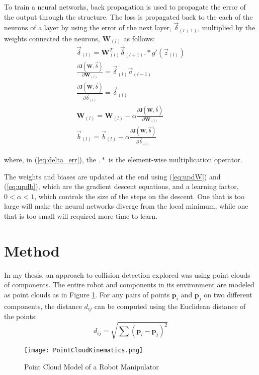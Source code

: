 \documentclass[conference]{IEEEtran}
\begin{document}
To train a neural networks, back propagation is used to propagate the error of the output through the structure. The loss is propagated back to the each of the neurons of a layer by using the error of the next layer, $\vec{\delta}_{(l+1)}$, multiplied by the weights connected the neurons, $\textbf{W}_{(l)}$ as follows:
\begin{gather}
\vec{\delta}_{(l)} = \textbf{W}_{(l)}^T \vec{\delta}_{(l+1)}.*g'(\vec{z}_{(l)}) \label{eq:delta_err}\\
\frac{\partial \textbf{J}(\textbf{W}, \vec{b})}{\partial \textbf{W}_{(l)}} = \vec{\delta}_{(l)}\vec{a}_{(l-1)}\\
\frac{\partial \textbf{J}(\textbf{W}, \vec{b})}{\partial \vec{b}_{(l)}} = \vec{\delta}_{(l)}\\
\textbf{W}_{(l)} = \textbf{W}_{(l)} - \alpha \frac{\partial \textbf{J}(\textbf{W}, \vec{b})}{\partial \textbf{W}_{(l)}} \label{eq:updW}\\
\vec{b}_{(l)} = \vec{b}_{(l)} - \alpha \frac{\partial \textbf{J}(\textbf{W}, \vec{b})}{\partial \vec{b}_{(l)}}\label{eq:updb}
\end{gather}

where, in (\ref{eq:delta_err}), the $.*$ is the element-wise multiplication operator. 
    
The weights and biases are updated at the end using (\ref{eq:updW}) and (\ref{eq:updb}), which are the gradient descent equations, and a learning factor, $0 < \alpha < 1$, which controls the size of the steps on the descent. One that is too large will make the neural networks diverge from the local minimum, while one that is too small will required more time to learn.

\section{Method}

In my thesis, an approach to collision detection explored was using point clouds of components. The entire robot and components in its environment are modeled as point clouds as in Figure \ref{fig:PointCloudModel}. For any pairs of points $\mathbf{p}_i$ and $\mathbf{p}_j$ on two different components, the distance $d_{ij}$ can be computed using the Euclidean distance of the points:
\begin{equation}
d_{ij} = \sqrt{ \sum (\mathbf{p}_i - \mathbf{p}_j)^2 } \label{eq:EuclDis}
\end{equation}

\begin{figure}[ht]
\centering
\texttt{[image: PointCloudKinematics.png]}
\caption{Point Cloud Model of a Robot Manipulator}
\label{fig:PointCloudModel}
\end{figure}
    
\end{document}
